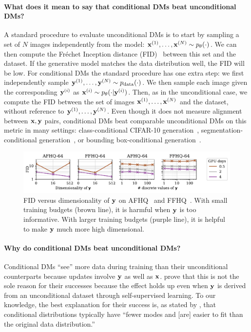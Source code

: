 \paragraph{What does it mean to say that conditional DMs beat unconditional DMs?} A standard procedure to evaluate unconditional DMs is to start by sampling a set of $N$ images independently from the model: ${{\mathbf{x}}^{(1)},\ldots,{\mathbf{x}}^{(N)} \sim p_\theta(\cdot)}$. We can then compute the Fr\'echet Inception distance (FID)~\citep{heusel2017gans} between this set and the dataset. If the generative model matches the data distribution well, the FID will be low.
%
For conditional DMs the standard procedure has one extra step: we first independently sample ${{\mathbf{y}}^{(1)},\ldots,{\mathbf{y}}^{(N)} \sim p_{\rm{data}}(\cdot)}$. We then sample each image given the corresponding ${\mathbf{y}}^{(i)}$ as ${{\mathbf{x}}^{(i)} \sim p_\theta(\cdot|{\mathbf{y}}^{(i)})}$. 
%
Then, as in the unconditional case, we compute the FID between the set of images ${\mathbf{x}}^{(1)},\ldots,{\mathbf{x}}^{(N)}$ and the dataset, without reference to ${\mathbf{y}}^{(1)},\ldots,{\mathbf{y}}^{(N)}$. Even though it does not measure alignment between ${\mathbf{x}}, {\mathbf{y}}$ pairs, conditional DMs beat comparable unconditional DMs on this metric in many settings: class-conditional CIFAR-10 generation~\citep{karras2022elucidating}, segmentation-conditional generation~\citep{hu2022self}, or bounding box-conditional generation~\citep{hu2022self}.

\begin{figure}[t]
    \centering
    \includegraphics[width=\textwidth]{figs/2sdm/cond-results-vs-nclusters.pdf}
    \caption{FID versus dimensionality of ${\mathbf{y}}$ on AFHQ~\citep{choi2020stargan} and FFHQ~\citep{karras2018style}. With small training budgets (brown line), it is harmful when ${\mathbf{y}}$ is too informative. With larger training budgets (purple line), it is helpful to make ${\mathbf{y}}$ much more high dimensional.}
    \label{fig:fid-vs-ncomp}
\end{figure}

\paragraph{Why do conditional DMs beat unconditional DMs?}

Conditional DMs ``see'' more data during training than their unconditional counterparts because updates involve ${\mathbf{y}}$ as well as ${\mathbf{x}}$. \citet{bao2022conditional,hu2022self} prove that this is not the sole reason for their successes because the effect holds up even when ${\mathbf{y}}$ is derived from an unconditional dataset through self-supervised learning.
%
To our knowledge, the best explanation for their success is, as stated by \citet{bao2022conditional}, that conditional distributions typically have ``fewer modes and [are] easier to fit than the original data distribution.''


